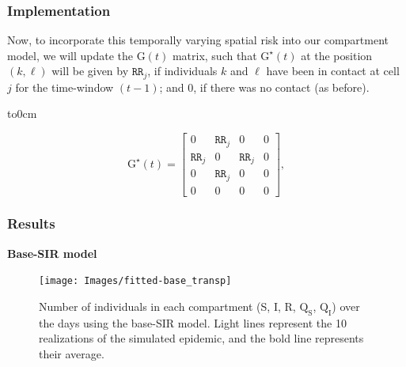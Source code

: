 \documentclass[12pt, aspectratio = 169]{beamer} %
\begin{document}
	\begin{frame}[t]
		\frametitle{Implementation}
		\justifying	
		
		Now, to incorporate this temporally varying spatial risk into our compartment model, we will update the $\text{G}(t)$ matrix, such that $\text{G}^{\star}(t)$ at the position $(k, \ell)$ will be given by $\texttt{RR}_j$, if individuals $k$ and $\ell$ have been in contact at cell $j$ for the time-window $(t - 1)$; and $0$, if there was no contact (as before).
		
		\begin{minipage}[t]{0.48\linewidth}
			\vbox to0cm{} %
			\centering
		\end{minipage}\hfill
		\begin{minipage}[t]{0.48\linewidth}
			\centering
			\[ \text{G}^{\star}(t) = 
			\begin{bmatrix}
				0 & \texttt{RR}_j & 0 & 0 \\
				\texttt{RR}_j & 0 & \texttt{RR}_j & 0 \\
				0 & \texttt{RR}_j & 0 & 0 \\
				0 & 0 & 0 & 0
			\end{bmatrix},
			\]
			\justifying
		\end{minipage}
		
	\end{frame}

	\begin{frame}[t]
		\frametitle{Results}
		\justifying	
		\textcolor{titles}{\textbf{Base-SIR model}}
		
		\begin{figure}
			\centering \vspace{-6pt}
			\texttt{[image: Images/fitted-base\_transp]} \vspace{-30pt}
			\caption{\justifying Number of individuals in each compartment (S, I, R, $\text{Q}_{\text{S}}$, $\text{Q}_{\text{I}}$) over the days using the base-SIR model. Light lines represent the 10 realizations of the simulated epidemic, and the bold line represents their average.}
			\label{fig:fitted-base}
		\end{figure}\vspace{-6pt}
	\end{frame}
\end{document}
